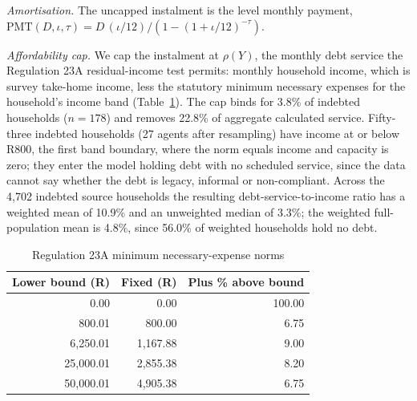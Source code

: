 \emph{Amortisation.} The uncapped instalment is the level monthly payment,
$\mathrm{PMT}(D, \iota, \tau) = D\,(\iota/12) / (1 - (1+\iota/12)^{-\tau})$.

\emph{Affordability cap.} We cap the instalment at $\rho(Y)$, the monthly debt service the
Regulation 23A residual-income test permits: monthly household income, which is survey
take-home income, less the statutory minimum necessary expenses for the household's income band (Table~\ref{tab:reg23a-norms}). The cap binds
for 3.8\% of indebted households ($n = 178$) and removes 22.8\% of aggregate calculated service.
Fifty-three indebted households (27 agents after resampling) have income at or below R800,
the first band boundary, where the norm equals
income and capacity is zero; they enter the model holding debt with no scheduled service, since
the data cannot say whether the debt is legacy, informal or non-compliant. Across the 4{,}702
indebted source households the resulting debt-service-to-income ratio has a weighted mean of
10.9\% and an unweighted median of 3.3\%; the weighted full-population mean is 4.8\%, since
56.0\% of weighted households hold no debt.

\begin{table}[!htbp]
\centering
\caption{Regulation 23A minimum necessary-expense norms}
\label{tab:reg23a-norms}
\small
\begin{tabular}{rrr}
\toprule
\textbf{Lower bound (R)} & \textbf{Fixed (R)} & \textbf{Plus \% above bound} \\
\midrule
0.00 & 0.00 & 100.00 \\
800.01 & 800.00 & 6.75 \\
6{,}250.01 & 1{,}167.88 & 9.00 \\
25{,}000.01 & 2{,}855.38 & 8.20 \\
50{,}000.01 & 4{,}905.38 & 6.75 \\
\bottomrule
\end{tabular}
\end{table}

